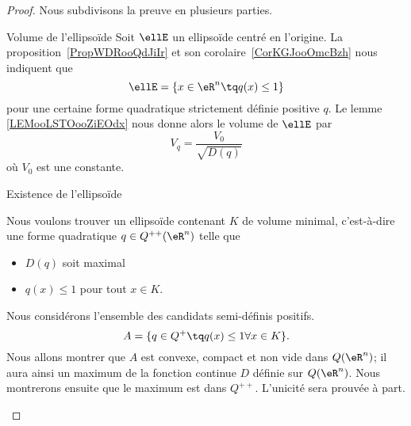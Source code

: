 \begin{proof}
    Nous subdivisons la preuve en plusieurs parties.
    \begin{subproof}
        \item[Volume de l'ellipsoïde]
            Soit \( \ellE\) un ellipsoïde centré en l'origine. La proposition~\ref{PropWDRooQdJiIr} et son corolaire~\ref{CorKGJooOmcBzh} nous indiquent que
            \begin{equation}
                \ellE=\{ x\in \eR^n\tq q(x)\leq 1 \}
            \end{equation}
            pour une certaine forme quadratique strictement définie positive \( q\). Le lemme \ref{LEMooLSTOooZiEOdx} nous donne alors le volume de \( \ellE\) par
            \begin{equation}
                V_q=\frac{ V_0 }{ \sqrt{ D(q) } }
            \end{equation}
            où \( V_0\) est une constante.
        \item[Existence de l'ellipsoïde]

            Nous voulons trouver un ellipsoïde contenant \( K\) de volume minimal, c'est-à-dire une forme quadratique \( q\in Q^{++}(\eR^n)\) telle que
            \begin{itemize}
                \item \( D(q)\) soit maximal
                \item \( q(x)\leq 1\) pour tout \( x\in K\).
            \end{itemize}
            Nous considérons l'ensemble des candidats semi-définis positifs.
            \begin{equation}
                A=\{ q\in Q^+\tq q(x)\leq 1\forall x\in K \}.
            \end{equation}
            Nous allons montrer que \( A\) est convexe, compact et non vide dans \( Q(\eR^n)\); il aura ainsi un maximum de la fonction continue \( D\) définie sur \( Q(\eR^n)\). Nous montrerons ensuite que le maximum est dans \( Q^{++}\). L'unicité sera prouvée à part.


\end{subproof}
\end{proof}
